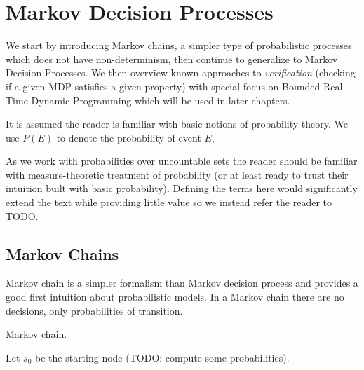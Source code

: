 \chapter{Markov Decision Processes}
\label{ch_mdp}

We start by introducing Markov chains, a simpler type of probabilistic
processes which does not have non-determinism,
then continue to generalize to Markov Decision Processes.
We then overview known approaches to {\em verification} (checking if a
given MDP satisfies a given property) with special focus on Bounded
Real-Time Dynamic Programming which will be used in later chapters.

It is assumed the reader is familiar with basic notions of probability
theory. We use $P(E)$ to denote the probability of event $E$,

As we work with probabilities over uncountable sets the reader should be
familiar with measure-theoretic treatment of probability (or at least
ready to trust their intuition built with basic probability).
Defining the terms here would significantly extend the text while
providing little value so we instead refer the reader to TODO.

\section{Markov Chains}

Markov chain is a simpler formalism than
Markov decision process and provides a good first intuition about
probabilistic models. In a Markov chain there are no decisions, only
probabilities of transition.

\begin{definition}
    Markov chain.
\end{definition}

\begin{example}
    Let $s_0$ be the starting node (TODO: compute some
    probabilities).

\hfill \break
\centering
{}
\end{example}

